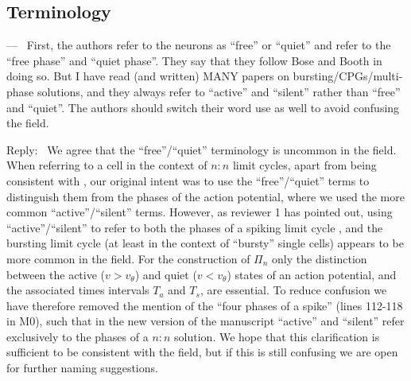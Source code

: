 \documentclass[utf8]{article}
\newcounter{point}[section]
\newenvironment{point}
{\refstepcounter{point} \bigskip \noindent {\textbf{Point~P\thesubsection.\arabic{point}} } ---\ }
{\par }
\newenvironment{reply}
{\medskip \noindent Reply:\  }
		{\medskip}
\begin{document}
\subsection{Terminology}
\setcounter{point}{0}

\begin{point}
	First, the authors refer to the neurons as ``free'' or ``quiet'' and refer to the ``free phase'' and ``quiet phase''.
	They say that they follow Bose and Booth in doing so.
	But I have read (and written) MANY papers on bursting\slash CPGs\slash multi-phase solutions, and they always refer to ``active'' and ``silent'' rather than ``free'' and ``quiet''.
	The authors should switch their word use as well to avoid confusing the field.
\end{point}
\begin{reply}
	We agree that the ``free''\slash``quiet'' terminology is uncommon in the field.
	When referring to a cell in the context of $n:n$ limit cycles, apart from being consistent with \citet{bose2011}, our original intent was to use the ``free''\slash``quiet'' terms to distinguish them from the phases of the action potential, where we used the more common ``active''\slash ``silent'' terms.
	However, as reviewer 1 has pointed out, using ``active''\slash``silent'' to refer to both the phases of a spiking limit cycle \cite[e.g.~p.~250]{ermentrout2010}, and the bursting limit cycle \cite[e.g.~p.~103]{ermentrout2010} (at least in the context of ``bursty'' single cells) appears to be more common in the field.
	For the construction of $\Pi_{n}$ only the distinction between the active ($v>v_{\theta}$) and quiet ($v<v_{\theta}$) states of an action potential, and the associated times intervals $T_{a}$ and $T_{s}$, are essential.
	To reduce confusion we have therefore removed the mention of the ``four phases of a spike'' (lines 112-118 in M0), such that in the new version of the manuscript ``active'' and ``silent'' refer exclusively to the phases of a $n:n$ solution.
	We hope that this clarification is sufficient to be consistent with the field, but if this is still confusing we are open for further naming suggestions.
\end{reply}
\end{document}
